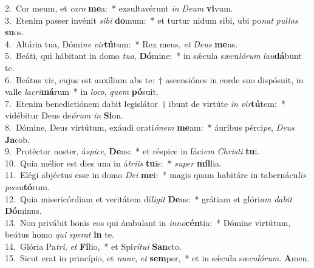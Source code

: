 {2.~}Cor meum, et \textit{ca}\textit{ro} \textbf{me}a:~* exsultavérunt \textit{in} \textit{De}\textit{um} \textbf{vi}vum.\\
{3.~}Etenim passer invénit \textit{si}\textit{bi} \textbf{do}mum:~* et turtur nidum sibi, ubi po\textit{nat} \textit{pul}\textit{los} \textbf{su}os.\\
{4.~}Altária tua, Dómi\textit{ne} \textit{vir}\textbf{tú}tum:~* Rex meus, \textit{et} \textit{De}\textit{us} \textbf{me}us.\\
{5.~}Beáti, qui hábitant in domo \textit{tu}\textit{a}, \textbf{Dó}mine:~* in sǽcula sæcu\textit{ló}\textit{rum} \textit{lau}\textbf{dá}bunt te.\\
{6.~}Beátus vir, cujus est auxílium abs te:~† ascensiónes in corde suo dispósuit, in valle \textit{la}\textit{cri}\textbf{má}rum~* in \textit{lo}\textit{co}, \textit{quem} \textbf{pó}suit.\\
{7.~}Etenim benedictiónem dabit legislátor~† ibunt de virtúte \textit{in} \textit{vir}\textbf{tú}tem:~* vidébitur Deus de\textit{ó}\textit{rum} \textit{in} \textbf{Si}on.\\
{8.~}Dómine, Deus virtútum, exáudi orati\textit{ó}\textit{nem} \textbf{me}am:~* áuribus pérci\textit{pe}, \textit{De}\textit{us} \textbf{Ja}cob.\\
{9.~}Protéctor noster, á\textit{spi}\textit{ce}, \textbf{De}us:~* et réspice in fáci\textit{em} \textit{Chri}\textit{sti} \textbf{tu}i.\\
{10.~}Quia mélior est dies una in á\textit{tri}\textit{is} \textbf{tu}is:~* \textit{su}\textit{per} \textbf{míl}lia.\\
{11.~}Elégi abjéctus esse in domo \textit{De}\textit{i} \textbf{me}i:~* magis quam habitáre in tabernácu\textit{lis} \textit{pec}\textit{ca}\textbf{tó}rum.\\
{12.~}Quia misericórdiam et veritátem dí\textit{li}\textit{git} \textbf{De}us:~* grátiam et glóri\textit{am} \textit{da}\textit{bit} \textbf{Dó}minus.\\
{13.~}Non privábit bonis eos qui ámbulant in \textit{in}\textit{no}\textbf{cén}tia:~* Dómine virtútum, beátus homo \textit{qui} \textit{spe}\textit{rat} \textbf{in} te.\\
{14.~}Glória Pa\textit{tri}, \textit{et} \textbf{Fí}lio,~* et Spi\textit{rí}\textit{tu}\textit{i} \textbf{San}cto.\\
{15.~}Sicut erat in princípio, et \textit{nunc}, \textit{et} \textbf{sem}per,~* et in sǽcula sæ\textit{cu}\textit{ló}\textit{rum}. \textbf{A}men.\\

